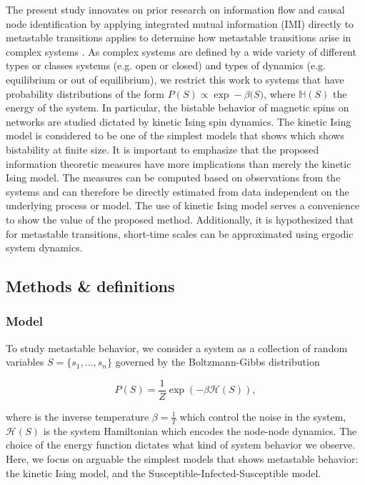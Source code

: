 \documentclass[a4paper, 11pt, twocolumn]{article}
\begin{document}
The present study innovates on prior research on information
flow and  causal node identification by  applying integrated
mutual information (IMI)  directly to metastable transitions
applies  to determine  how metastable  transitions arise  in
complex  systems  \cite{Quax2013,vanElteren2021}.  As  complex
systems are defined by a  wide variety of different types or
classes systems (e.g. open or  closed) and types of dynamics
(e.g. equilibrium  or out of equilibrium),  we restrict this
work to  systems that have probability  distributions of the
form $P(S) \propto \exp  -\beta \mathbb(S)$, where $\mathbb{H}(S)$ the
energy of  the system. In particular,  the bistable behavior
of  magnetic  spins  on  networks are  studied  dictated  by
kinetic  Ising spin  dynamics.  The kinetic  Ising model  is
considered to be one of the simplest models that shows which
shows  bistability  at  finite  size.  It  is  important  to
emphasize that  the proposed information  theoretic measures
have more implications than  merely the kinetic Ising model.
The measures can be computed  based on observations from the
systems and  can therefore  be directly estimated  from data
independent on the  underlying process or model.  The use of
kinetic Ising model  serves a convenience to  show the value
of  the proposed  method. Additionally,  it is  hypothesized
that for  metastable transitions,  short-time scales  can be
approximated using ergodic system dynamics.

\subsection{Methods \& definitions}
\label{sec:org8193119}
\subsubsection{Model}
\label{sec:org5382bb5}
To  study metastable  behavior, we  consider a  system as  a
collection of random variables $S = \{s_1, \dots, s_n\}$ governed
by the Boltzmann-Gibbs distribution

\begin{equation}
P(S)    =     \frac{1}{Z}    \exp(- \beta \mathcal{H}(S) ),
\end{equation}

where  is the  inverse temperature  $\beta =  \frac{1}{T}$ which
control  the  noise in  the  system,  $\mathcal{H}(S)$ is  the  system
Hamiltonian which encodes the node-node dynamics. The choice
of the energy function dictates what kind of system behavior
we observe. Here, we focus on arguable the simplest models that
shows metastable behavior: the  kinetic Ising model, and the
Susceptible-Infected-Susceptible model.
\end{document}

